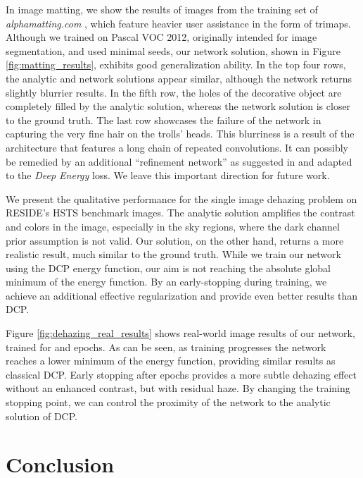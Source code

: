 \documentclass[journal]{IEEEtran}
\begin{document}
In image matting, we show the results of images from the training set of \textit{alphamatting.com} \cite{alpha_matting_com}, which feature heavier user assistance in the form of trimaps. Although we trained on Pascal VOC 2012, originally intended for image segmentation, and used minimal seeds, our network solution, shown in Figure \ref{fig:matting_results}, exhibits good generalization ability. In the top four rows, the analytic and network solutions appear similar, although the network returns slightly blurrier results. In the fifth row, the holes of the decorative object are completely filled by the analytic solution, whereas the network solution is closer to the ground truth. The last row showcases the failure of the network in capturing the very fine hair on the trolls' heads. This blurriness is a result of the architecture that features a long chain of repeated convolutions. It can possibly be remedied by an additional ``refinement network'' as suggested in \cite{deep_matting} and adapted to the \emph{Deep Energy} loss. We leave this important direction for future work. 

We present the qualitative performance for the single image dehazing problem on RESIDE's HSTS benchmark images. The analytic solution amplifies the contrast and colors in the image, especially in the sky regions, where the dark channel prior assumption is not valid. Our solution, on the other hand, returns a more realistic result, much similar to the ground truth. While we train our network using the DCP energy function, our aim is not reaching the absolute global minimum of the energy function. By an early-stopping during training, we achieve an additional  effective regularization and provide even better results than DCP. 

Figure \ref{fig:dehazing_real_results} shows real-world image results of our network, trained for  and  epochs. As can be seen, as training progresses the network reaches a lower minimum of the energy function, providing similar results as classical DCP. Early stopping after  epochs provides a more subtle dehazing effect without an enhanced contrast, but with residual haze. By changing the training stopping point, we can control the proximity of the network to the analytic solution of DCP.



\section{Conclusion} \label{s:conclusion}
\end{document}
